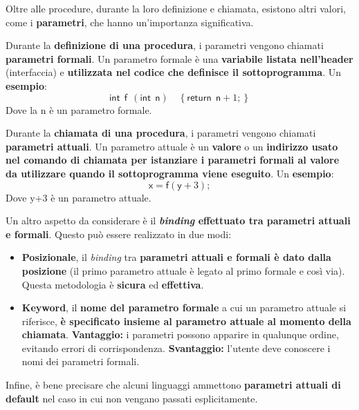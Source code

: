 \documentclass[a4paper]{article}
\begin{document}
	Oltre alle procedure, durante la loro definizione e chiamata, esistono altri valori, come i \textbf{parametri}, che hanno un'importanza significativa.\newline
	
	\noindent
	Durante la \textbf{definizione di una procedura}, i parametri vengono chiamati \textcolor{Red3}{\textbf{parametri formali}}. Un parametro formale è una \textbf{variabile listata nell'header} (interfaccia) e \textbf{utilizzata nel codice che definisce il sottoprogramma}. Un \textcolor{Green4}{\textbf{esempio}}:
	\begin{equation*}
		\textsf{int} \:\: \textsf{f} \:\: \left(\textsf{int} \:\: \textsf{n}\right) \hspace{1em} \left\{\textsf{return} \:\: \textsf{n}+1;\right\}
	\end{equation*}
	Dove la \textsf{n} è un parametro formale.\newline
	
	\noindent
	Durante la \textbf{chiamata di una procedura}, i parametri vengono chiamati \textcolor{Red3}{\textbf{parametri attuali}}. Un parametro attuale è un \textbf{valore} o un \textbf{indirizzo usato nel comando di chiamata per istanziare i parametri formali al valore da utilizzare quando il sottoprogramma viene eseguito}. Un \textcolor{Green4}{\textbf{esempio}}:
	\begin{equation*}
		\textsf{x} = \textsf{f}(\textsf{y} + 3);
	\end{equation*}
	Dove \textsf{y+3} è un parametro attuale.\newline
	
	\noindent
	Un altro aspetto da considerare è il \textbf{\emph{binding} effettuato tra parametri attuali e formali}. Questo può essere realizzato in due modi:
	\begin{itemize}
		\item \textcolor{Red3}{\textbf{Posizionale}}, il \emph{binding} tra \textbf{parametri attuali e formali è dato dalla posizione} (il primo parametro attuale è legato al primo formale e così via).\newline
		Questa metodologia è \textbf{sicura} ed \textbf{effettiva}.
		
		\item \textcolor{Red3}{\textbf{Keyword}}, il \textbf{nome del parametro formale} a cui un parametro attuale si riferisce, \textbf{è specificato insieme al parametro attuale al momento della chiamata}.\newline
		\textcolor{Green4}{\textbf{Vantaggio:}} i parametri possono apparire in qualunque ordine, evitando errori di corrispondenza.\newline
		\textcolor{Red4}{\textbf{Svantaggio:}} l'utente deve conoscere i nomi dei parametri formali.
	\end{itemize}
	Infine, è bene precisare che alcuni linguaggi ammettono \textbf{parametri attuali di default} nel caso in cui non vengano passati esplicitamente.\newpage
	
\end{document}
